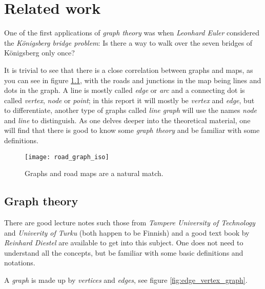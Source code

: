 \documentclass[../main.tex]{subfiles}
\begin{document}
\chapter{Related work}
One of the first applications of \emph{graph theory} was when \emph{Leonhard Euler} considered the \emph{Königsberg bridge problem}: Is there a way to walk over the seven bridges of Königsberg only once?

It is trivial to see that there is a close correlation between graphs and maps, as you can see in figure \ref{fig:road_graph}, with the roads and junctions in the map being lines and dots in the graph.  A line is mostly called \textit{edge} or \textit{arc} and a connecting dot is called \textit{vertex}, \textit{node} or \textit{point}; in this report it will mostly be \textit{vertex} and \textit{edge}, but to differentiate, another type of graphs called \textit{line graph} will use the names \textit{node} and \textit{line} to distinguish. As one delves deeper into the theoretical material, one will find that there is good to know some \emph{graph theory} and be familiar with some definitions.

\begin{figure}[h]
\centering
\texttt{[image: road\_graph\_iso]}
\caption{Graphs and road maps are a natural match.}
\label{fig:road_graph}
\end{figure}

\section{Graph theory}
There are good lecture notes such those from \emph{Tampere University of Technology} \cite{ruohonen-graph-theory} and \emph{Univerity of Turku} \cite{harju-graph-theory} (both happen to be Finnish) and a good text book by \emph{Reinhard Diestel} \cite{diestel} are available to get into this subject. One does not need to understand all the concepts, but be familiar with some basic definitions and notations.

A \textit{graph} is made up by \textit{vertices} and \textit{edges}, see figure \ref{fig:edge_vertex_graph}.
\end{document}
